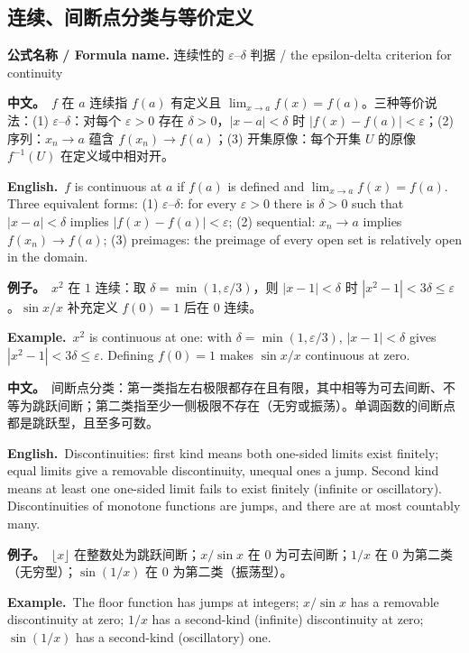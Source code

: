 \documentclass[UTF8,11pt,a4paper]{ctexart}
\newcommand{\BOTH}[2]{\par\noindent\textbf{中文。}\ #1\par\noindent\textbf{English.}\ #2\par}
\newcommand{\EX}[2]{\par\noindent\textbf{例子。}\ #1\par\noindent\textbf{Example.}\ #2\par}
\newcommand{\FORMULA}[2]{\par\noindent\textbf{公式名称 / Formula name.} #1 / #2\par}
\begin{document}
\subsection{连续、间断点分类与等价定义}
\FORMULA{连续性的 $\varepsilon$--$\delta$ 判据}{the epsilon-delta criterion for continuity}
\BOTH{$f$ 在 $a$ 连续指 $f(a)$ 有定义且 $\lim_{x\to a}f(x)=f(a)$。三种等价说法：(1) $\varepsilon$--$\delta$：对每个 $\varepsilon>0$ 存在 $\delta>0$，$|x-a|<\delta$ 时 $|f(x)-f(a)|<\varepsilon$；(2) 序列：$x_n\to a$ 蕴含 $f(x_n)\to f(a)$；(3) 开集原像：每个开集 $U$ 的原像 $f^{-1}(U)$ 在定义域中相对开。}{$f$ is continuous at $a$ if $f(a)$ is defined and $\lim_{x\to a}f(x)=f(a)$. Three equivalent forms: (1) $\varepsilon$--$\delta$: for every $\varepsilon>0$ there is $\delta>0$ such that $|x-a|<\delta$ implies $|f(x)-f(a)|<\varepsilon$; (2) sequential: $x_n\to a$ implies $f(x_n)\to f(a)$; (3) preimages: the preimage of every open set is relatively open in the domain.}
\EX{$x^2$ 在 $1$ 连续：取 $\delta=\min(1,\varepsilon/3)$，则 $|x-1|<\delta$ 时 $|x^2-1|<3\delta\le\varepsilon$。$\sin x/x$ 补充定义 $f(0)=1$ 后在 $0$ 连续。}{$x^2$ is continuous at one: with $\delta=\min(1,\varepsilon/3)$, $|x-1|<\delta$ gives $|x^2-1|<3\delta\le\varepsilon$. Defining $f(0)=1$ makes $\sin x/x$ continuous at zero.}
\BOTH{间断点分类：第一类指左右极限都存在且有限，其中相等为可去间断、不等为跳跃间断；第二类指至少一侧极限不存在（无穷或振荡）。单调函数的间断点都是跳跃型，且至多可数。}{Discontinuities: first kind means both one-sided limits exist finitely; equal limits give a removable discontinuity, unequal ones a jump. Second kind means at least one one-sided limit fails to exist finitely (infinite or oscillatory). Discontinuities of monotone functions are jumps, and there are at most countably many.}
\EX{$\lfloor x\rfloor$ 在整数处为跳跃间断；$x/\sin x$ 在 $0$ 为可去间断；$1/x$ 在 $0$ 为第二类（无穷型）；$\sin(1/x)$ 在 $0$ 为第二类（振荡型）。}{The floor function has jumps at integers; $x/\sin x$ has a removable discontinuity at zero; $1/x$ has a second-kind (infinite) discontinuity at zero; $\sin(1/x)$ has a second-kind (oscillatory) one.}
\end{document}
